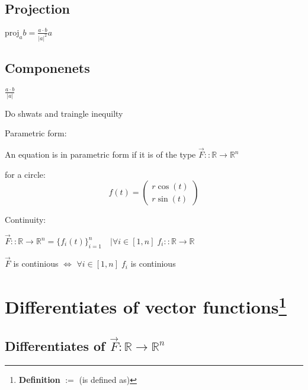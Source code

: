 \documentclass{tufte-book}
\begin{document}
\hypertarget{projection}{%
\subsection{Projection}\label{projection}}

\(\text{proj}_a b = \frac{a \cdot b}{|a|^2} a\quad\)

\hypertarget{componenets}{%
\subsection{Componenets}\label{componenets}}

\(\frac{a \cdot b}{|a|}\)

Do shwats and traingle inequilty

Parametric form:

An equation is in parametric form if it is of the type
\(\vec{F} :: \mathbb{R} \to \mathbb{R}^n\)

for a circle:
\[f(t) =  \begin{pmatrix} r \cos (t) \\ r \sin (t) \end{pmatrix}\]

Continuity:

\(\vec{F} :: \mathbb{R} \to \mathbb{R}^n = \{f_i(t)\}_{i=1}^{n} \quad | \forall i \in [1 , n] \; f_i:: \mathbb{R} \to \mathbb{R}\)

\(\vec{F}\) is continious \(\iff\) \(\forall i \in [1,n] \; f_i\) is
continious\hypertarget{differentiates-of-vector-functions}{%
\section[Differentiates of vector
functions]{\texorpdfstring{Differentiates of vector functions\footnote{\textbf{Definition}
  \(:=\) (is defined as)}}{Differentiates of vector functions}}\label{differentiates-of-vector-functions}}

\hypertarget{differentiates-of-vecf-mathbbr-to-mathbbrn}{%
\subsection{\texorpdfstring{Differentiates of
\(\vec{F}: \mathbb{R} \to \mathbb{R}^n\)}{Differentiates of \textbackslash{}vec\{F\}: \textbackslash{}mathbb\{R\} \textbackslash{}to \textbackslash{}mathbb\{R\}\^{}n}}\label{differentiates-of-vecf-mathbbr-to-mathbbrn}}
\end{document}
